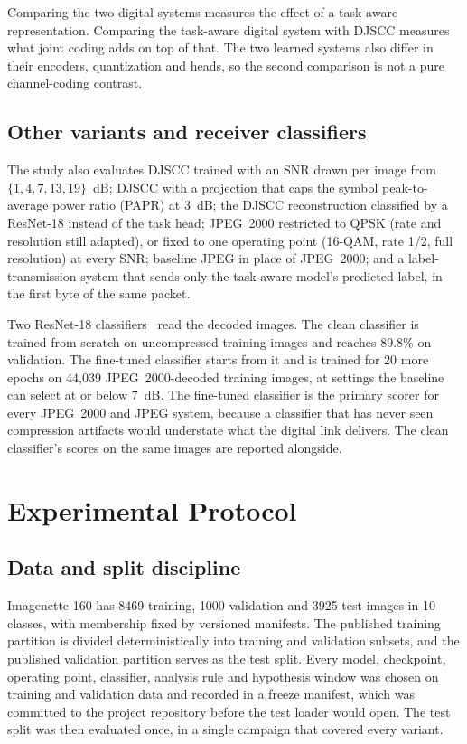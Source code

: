 \documentclass[conference]{IEEEtran}
\begin{document}
Comparing the two digital systems measures the effect of a task-aware representation. Comparing the task-aware digital system with DJSCC measures what joint coding adds on top of that. The two learned systems also differ in their encoders, quantization and heads, so the second comparison is not a pure channel-coding contrast.

\subsection{Other variants and receiver classifiers}
The study also evaluates DJSCC trained with an SNR drawn per image from $\{1,4,7,13,19\}$~dB; DJSCC with a projection that caps the symbol peak-to-average power ratio (PAPR) at 3~dB; the DJSCC reconstruction classified by a ResNet-18 instead of the task head; JPEG~2000 restricted to QPSK (rate and resolution still adapted), or fixed to one operating point (16-QAM, rate 1/2, full resolution) at every SNR; baseline JPEG in place of JPEG~2000; and a label-transmission system that sends only the task-aware model's predicted label, in the first byte of the same packet.

Two ResNet-18 classifiers~\cite{he2016resnet} read the decoded images. The clean classifier is trained from scratch on uncompressed training images and reaches 89.8\% on validation. The fine-tuned classifier starts from it and is trained for 20 more epochs on 44,039 JPEG~2000-decoded training images, at settings the baseline can select at or below 7~dB. The fine-tuned classifier is the primary scorer for every JPEG~2000 and JPEG system, because a classifier that has never seen compression artifacts would understate what the digital link delivers. The clean classifier's scores on the same images are reported alongside.

\section{Experimental Protocol}
\subsection{Data and split discipline}
\label{sec:repro}
Imagenette-160 has 8469 training, 1000 validation and 3925 test images in 10 classes, with membership fixed by versioned manifests. The published training partition is divided deterministically into training and validation subsets, and the published validation partition serves as the test split. Every model, checkpoint, operating point, classifier, analysis rule and hypothesis window was chosen on training and validation data and recorded in a freeze manifest, which was committed to the project repository before the test loader would open. The test split was then evaluated once, in a single campaign that covered every variant.
\end{document}
